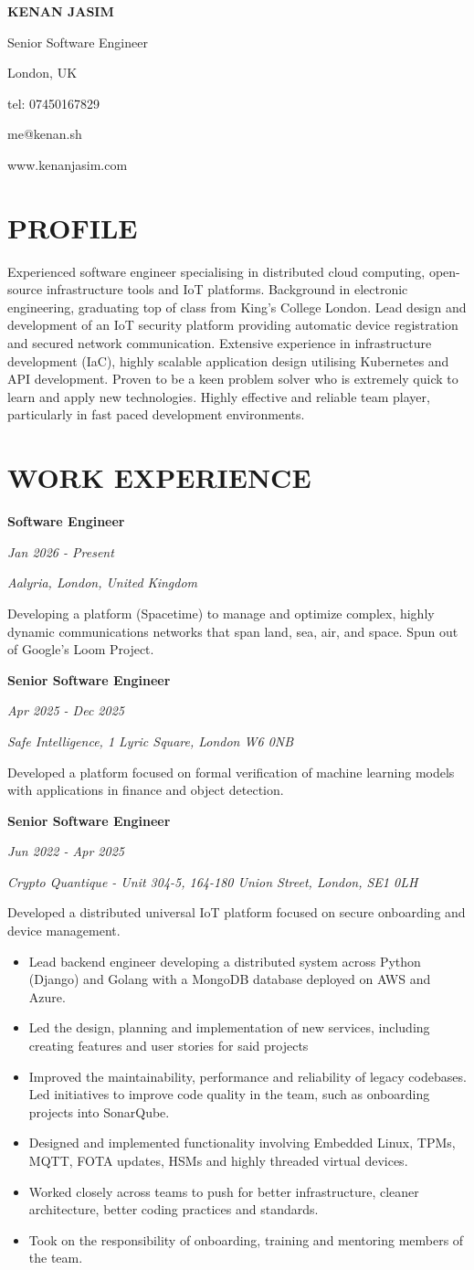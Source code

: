 \documentclass[11pt,a4paper]{article}
\newcommand{\header}[6]{
    \noindent
    \begin{minipage}[t]{0.6\textwidth}
        {\Huge\bfseries #1}
        
        \vspace{5pt}
        {\Large #2}
    \end{minipage}%
    \hfill
    \begin{minipage}[t]{0.35\textwidth}
        \raggedleft
        #3
        
        tel: #4
        
        #5
        
        #6
    \end{minipage}
    
    \vspace{20pt}
}
\newcommand{\cventry}[5]{
    \noindent
    \begin{minipage}[t]{0.3\textwidth}
        \raggedright
        \textbf{#1}
        
        \textit{#2}
    \end{minipage}%
    \hfill
    \begin{minipage}[t]{0.7\textwidth}
        \raggedright
        \textit{#3}
        
        #4
        
        #5
    \end{minipage}
    
    \vspace{8pt}
}
\begin{document}
\header{KENAN JASIM}{Senior Software Engineer}{London, UK}{07450167829}{me@kenan.sh}{www.kenanjasim.com}

\section{PROFILE}
Experienced software engineer specialising in distributed cloud computing, open-source infrastructure tools and IoT platforms. Background in electronic engineering, graduating top of class from King's College London. Lead design and development of an IoT security platform providing automatic device registration and secured network communication. Extensive experience in infrastructure development (IaC), highly scalable application design utilising Kubernetes and API development. Proven to be a keen problem solver who is extremely quick to learn and apply new technologies. Highly effective and reliable team player, particularly in fast paced development environments.

\section{WORK EXPERIENCE}

\cventry{Software Engineer}{Jan 2026 - Present}{Aalyria, London, United Kingdom}{}{
Developing a platform (Spacetime) to manage and optimize complex, highly dynamic communications networks that span land, sea, air, and space. Spun out of Google's Loom Project.
}

\cventry{Senior Software Engineer}{Apr 2025 - Dec 2025}{Safe Intelligence, 1 Lyric Square, London W6 0NB}{}{
Developed a platform focused on formal verification of machine learning models with applications in finance and object detection.
}

\cventry{Senior Software Engineer}{Jun 2022 - Apr 2025}{Crypto Quantique - Unit 304-5, 164-180 Union Street, London, SE1 0LH}{}{
Developed a distributed universal IoT platform focused on secure onboarding and device management.
\begin{itemize}[leftmargin=15pt, itemsep=2pt]
    \item Lead backend engineer developing a distributed system across Python (Django) and Golang with a MongoDB database deployed on AWS and Azure.
    \item Led the design, planning and implementation of new services, including creating features and user stories for said projects
    \item Improved the maintainability, performance and reliability of legacy codebases. Led initiatives to improve code quality in the team, such as onboarding projects into SonarQube.
    \item Designed and implemented functionality involving Embedded Linux, TPMs, MQTT, FOTA updates, HSMs and highly threaded virtual devices.
    \item Worked closely across teams to push for better infrastructure, cleaner architecture, better coding practices and standards.
    \item Took on the responsibility of onboarding, training and mentoring members of the team.
\end{itemize}
}
\end{document}
